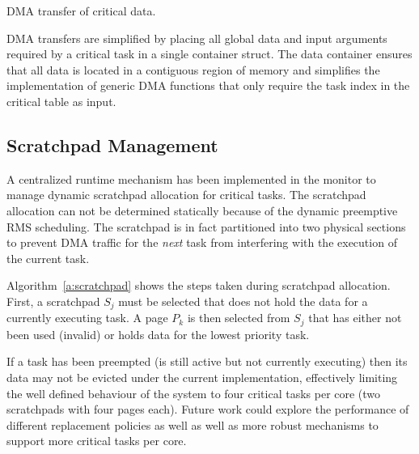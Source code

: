 \begin{algorithm}

\caption{DMA transfer of critical data.}
\label{a:dma}
\end{algorithm}

DMA transfers are simplified by placing all global data and input arguments required by a critical task in a single container struct. 
The data container ensures that all data is located in a contiguous region of memory and simplifies the implementation of generic DMA functions that only require the task index in the critical table as input.


\subsection{Scratchpad Management}
\label{s:scratchpad}

	A centralized runtime mechanism has been implemented in the monitor to manage dynamic scratchpad allocation for critical tasks.
	The scratchpad allocation can not be determined statically because of the dynamic preemptive RMS scheduling. 
	The scratchpad is in fact partitioned into two physical sections to prevent DMA traffic for the \emph{next} task from interfering with the execution of the current task. 
	
	Algorithm~\ref{a:scratchpad} shows the steps taken during scratchpad allocation. 
	First, a scratchpad $S_j$ must be selected that does not hold the data for a currently executing task. 
	A page $P_k$ is then selected from $S_j$ that has either not been used (invalid) or holds data for the lowest priority task.

	If a task has been preempted (is still active but not currently executing) then its data may not be evicted under the current implementation, effectively limiting the well defined behaviour of the system to four critical tasks per core (two scratchpads with four pages each).
	Future work could explore the performance of different replacement policies as well as well as more robust mechanisms to support more critical tasks per core.
	
